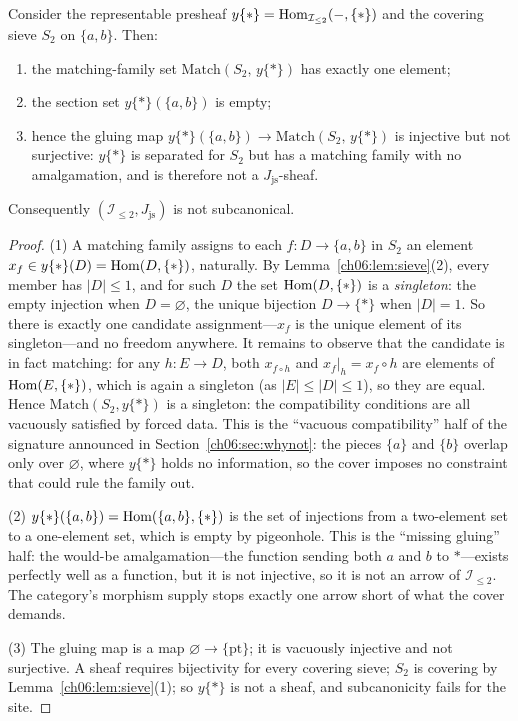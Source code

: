 \begin{theorem}
\label{ch06:thm:notsheaf}
Consider the representable presheaf $y\{*\}=\mathrm{Hom}_{\mathcal{I}_{\le 2}}(-,\{*\})$
and the covering sieve $S_2$ on $\{a,b\}$. Then:
\begin{enumerate}
\item the matching-family set $\mathrm{Match}(S_2,\,y\{*\})$ has exactly one
element;
\item the section set $y\{*\}(\{a,b\})$ is empty;
\item hence the gluing map
$y\{*\}(\{a,b\})\to\mathrm{Match}(S_2,\,y\{*\})$ is injective but not
surjective: $y\{*\}$ is separated for $S_2$ but has a matching family with
no amalgamation, and is therefore not a $J_{\mathrm{js}}$-sheaf.
\end{enumerate}
Consequently $(\mathcal{I}_{\le 2},J_{\mathrm{js}})$ is not subcanonical.
\end{theorem}

\begin{proof}
(1) A matching family assigns to each $f:D\to\{a,b\}$ in $S_2$ an element
$x_f\in y\{*\}(D)=\mathrm{Hom}(D,\{*\})$, naturally. By
Lemma~\ref{ch06:lem:sieve}(2), every member has $|D|\le 1$, and for such $D$
the set $\mathrm{Hom}(D,\{*\})$ is a \emph{singleton}: the empty injection when
$D=\varnothing$, the unique bijection $D\to\{*\}$ when $|D|=1$. So there is
exactly one candidate assignment---$x_f$ is the unique element of its
singleton---and no freedom anywhere. It remains to observe that the
candidate is in fact matching: for any $h:E\to D$, both $x_{f\circ h}$ and
$x_f|_h=x_f\circ h$ are elements of $\mathrm{Hom}(E,\{*\})$, which is again a
singleton (as $|E|\le|D|\le 1$), so they are equal. Hence
$\mathrm{Match}(S_2,y\{*\})$ is a singleton: the compatibility conditions
are all vacuously satisfied by forced data. This is the ``vacuous
compatibility'' half of the signature announced in
Section~\ref{ch06:sec:whynot}: the pieces $\{a\}$ and $\{b\}$ overlap only
over $\varnothing$, where $y\{*\}$ holds no information, so the cover
imposes no constraint that could rule the family out.

(2) $y\{*\}(\{a,b\})=\mathrm{Hom}(\{a,b\},\{*\})$ is the set of injections from a
two-element set to a one-element set, which is empty by pigeonhole. This is
the ``missing gluing'' half: the would-be amalgamation---the function
sending both $a$ and $b$ to $*$---exists perfectly well as a function, but
it is not injective, so it is not an arrow of $\mathcal{I}_{\le 2}$. The
category's morphism supply stops exactly one arrow short of what the cover
demands.

(3) The gluing map is a map $\varnothing\to\{\text{pt}\}$; it is vacuously
injective and not surjective. A sheaf requires bijectivity for every
covering sieve; $S_2$ is covering by Lemma~\ref{ch06:lem:sieve}(1); so
$y\{*\}$ is not a sheaf, and subcanonicity fails for the site.
\end{proof}

